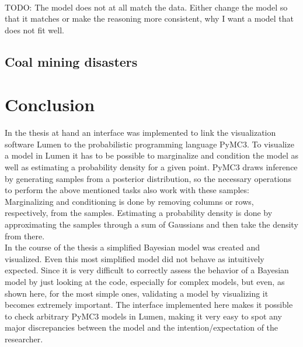 \documentclass{article}
\begin{document}
\\
TODO: The model does not at all match the data. Either change the model so that it matches or make the reasoning more consistent, why I want a model that does not fit well.
\subsection{Coal mining disasters}



\section {Conclusion}
In the thesis at hand an interface was implemented to link the visualization software Lumen to the probabilistic programming language PyMC3. To visualize a model in Lumen it has to be possible to marginalize and condition the model as well as estimating a probability density for a given point. PyMC3 draws inference by generating samples from a posterior distribution, so the necessary operations to perform the above mentioned tasks also work with these samples: Marginalizing and conditioning is done by removing columns or rows, respectively, from the samples. Estimating a probability density is done by approximating the samples through a sum of Gaussians and then take the density from there.\\
In the course of the thesis a simplified Bayesian model was created and visualized. Even this most simplified model did not behave as intuitively expected. Since it is very difficult to correctly assess the behavior of a Bayesian model by just looking at the code, especially for complex models, but even, as shown here, for the most simple ones, validating a model by visualizing it becomes extremely important. The interface implemented here makes it possible to check arbitrary PyMC3 models in Lumen, making it very easy to spot any major discrepancies between the model and the intention/expectation of the researcher.
\listoffigures
        


\end{document}
